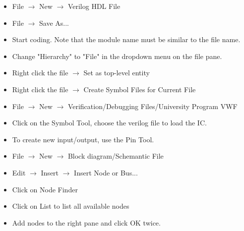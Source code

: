         \begin{itemize}
            \item File $\to$ New $\to$ Verilog HDL File
            \item File $\to$ Save As...
            \item Start coding. Note that the module name must be similar to the
            file name.
        \end{itemize}
        \begin{itemize}
            \item Change "Hierarchy" to "File" in the dropdown menu on the file pane.
            \item Right click the file $\to$ Set as top-level entity
            \item Right click the file $\to$ Create Symbol Files for Current File
            \item File $\to$ New $\to$ Verification/Debugging Files/University
                Program VWF
            \item Click on the Symbol Tool, choose the verilog file to load the IC.
            \item To create new input/output, use the Pin Tool.
        \end{itemize}
        \begin{itemize}
            \item File $\to$ New $\to$ Block diagram/Schemantic File
            \item Edit $\to$ Insert $\to$ Insert Node or Bus...
            \item Click on Node Finder
            \item Click on List to list all available nodes
            \item Add nodes to the right pane and click OK twice.
        \end{itemize}